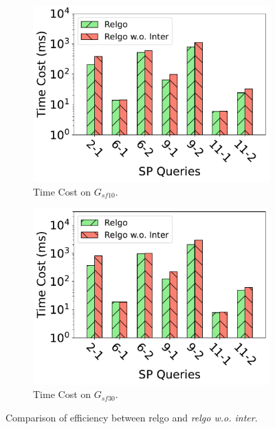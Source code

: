 \begin{figure}[ht]
    \centering
    \begin{subfigure}[b]{.45\linewidth}
        \centering
        \includegraphics[width=\linewidth]{./figures/exp/filter_sf10.pdf}
        \caption{Time Cost on $G_{sf10}$.}
        \label{fig:exp-filter-sf10}
    \end{subfigure}
    \begin{subfigure}[b]{0.45\linewidth}
        \centering
        \includegraphics[width=\linewidth]{./figures/exp/filter_sf30.pdf}
        \caption{Time Cost on $G_{sf30}$.}
        \label{fig:exp-filter-sf30}
    \end{subfigure}
    \caption{Comparison of efficiency between relgo and \textit{relgo w.o. inter}.}
    \label{fig:exp-filter}
\end{figure}

